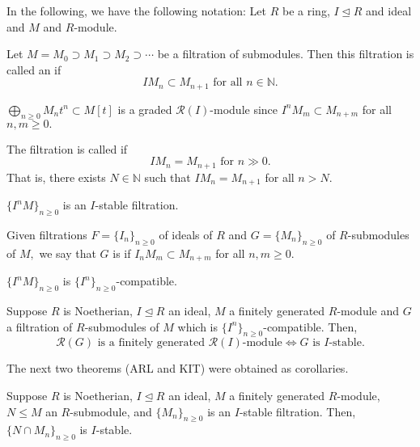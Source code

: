 \documentclass[12pt]{article}	%
\begin{document}
In the following, we have the following notation: Let $R$ be a ring, $I \unlhd R$ and ideal and $M$ and $R$-module.

\begin{defn}%
	Let $M = M_0 \supset M_1 \supset M_2 \supset \cdots$ be a filtration of submodules. Then this filtration is called an  if 
	\begin{equation*} 
		IM_n \subset M_{n + 1} \text{ for all }n \in \mathbb{N}.
	\end{equation*}

	$\bigoplus_{n \ge 0}M_nt^n \subset M[t]$ is a graded $\mathcal{R}(I)$-module since $I^nM_m \subset M_{n + m}$ for all $n, m \ge 0.$

	The filtration is called  if 
	\begin{equation*} 
		IM_n = M_{n + 1} \text{ for }n \gg 0.
	\end{equation*}
	That is, there exists $N \in \mathbb{N}$ such that $IM_n = M_{n + 1}$ for all $n > N.$
\end{defn}
\begin{ex}
	$\{I^nM\}_{n \ge 0}$ is an $I$-stable filtration.
\end{ex}

\begin{defn}%
	Given filtrations $F = \{I_n\}_{n \ge 0}$ of ideals of $R$ and $G = \{M_n\}_{n \ge 0}$ of $R$-submodules of $M,$ we say that $G$ is  if $I_nM_m \subset M_{n + m}$ for all $n, m \ge 0.$
\end{defn}
\begin{ex}
	$\{I^nM\}_{n \ge 0}$ is $\{I^n\}_{n \ge 0}$-compatible.
\end{ex}

\begin{thm}
	Suppose $R$ is Noetherian, $I \unlhd R$ an ideal, $M$ a finitely generated $R$-module and $G$ a filtration of $R$-submodules of $M$ which is $\{I^n\}_{n \ge 0}$-compatible. Then,
	\begin{equation*} 
		\mathcal{R}(G) \text{ is a finitely generated }\mathcal{R}(I)\text{-module} \iff G \text{ is } I \text{-stable}.
	\end{equation*}
\end{thm}

The next two theorems (ARL and KIT) were obtained as corollaries.

\begin{thm}
	Suppose $R$ is Noetherian, $I \unlhd R$ an ideal, $M$ a finitely generated $R$-module, $N \le M$ an $R$-submodule, and $\{M_n\}_{n \ge 0}$ is an $I$-stable filtration. Then, $\{N \cap M_n\}_{n \ge 0}$ is $I$-stable.
\end{thm}
\end{document}
